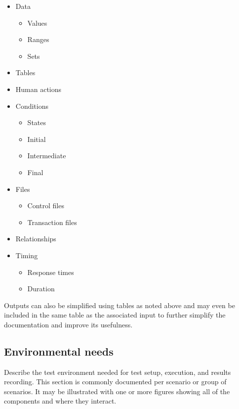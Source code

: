 \documentclass{./template/openetcs_report}
\begin{document}
\begin{itemize}
\item Data 
    \begin{itemize}
        \item Values 
        \item Ranges 
        \item Sets
    \end{itemize} 
\item Tables 
\item Human actions
\item Conditions 
    \begin{itemize}
        \item States 
        \item Initial 
        \item Intermediate 
        \item Final
    \end{itemize}
\item Files 
    \begin{itemize}
        \item Control files 
        \item Transaction files
    \end{itemize}
\item Relationships
\item Timing 
    \begin{itemize}
        \item Response times
        \item Duration 
    \end{itemize}
\end{itemize}

Outputs can also be simplified using tables as noted above
 and may even be included in the same table as the associated input to further
simplify the documentation and improve its usefulness.


\subsection{Environmental needs}

Describe the test environment needed for test setup, execution, and results
recording. This section is commonly documented per scenario or group of
scenarios. It may be illustrated with one or more figures showing all of the
components and where they interact.
\end{document}
